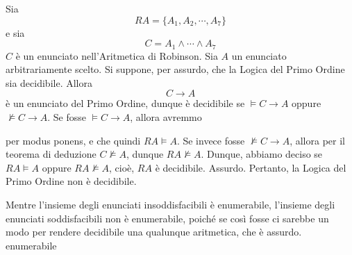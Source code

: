 \begin{teo}
        Sia 
        $$
        RA = \{A_1, A_2, \cdots, A_7\} 
        $$
        e sia 
        $$
        C = A_1 \land \cdots \land A_7
        $$
        $C$ è un enunciato nell'Aritmetica di Robinson. Sia 
        $A$ un enunciato arbitrariamente scelto. Si suppone, per assurdo, che la 
        Logica del Primo Ordine sia decidibile. Allora 
        $$
        C \rightarrow A
        $$
        è un enunciato del Primo Ordine, 
        dunque è decidibile se $\models C \rightarrow A$ oppure $\nvDash C \rightarrow A$. 
        Se fosse $\models C\rightarrow A$, allora avremmo 
        \begin{prooftree}
        \end{prooftree}
        per modus ponens, e che quindi $RA \models A$. Se invece 
        fosse $\nvDash C \rightarrow A$, allora per il teorema di deduzione 
        $C \nvDash A$, dunque $RA \nvDash A$.  
        Dunque, abbiamo deciso se $RA \models A$ oppure $RA \nvDash A$, cioè, 
        $RA$ è decidibile. Assurdo. Pertanto, la Logica del Primo Ordine non è decidibile.
\end{teo}

Mentre l'insieme degli enunciati insoddisfacibili è enumerabile, l'insieme degli 
enunciati soddisfacibili non è enumerabile, poiché se così fosse ci sarebbe un 
modo per rendere decidibile una qualunque aritmetica, che è assurdo.
enumerabile 
